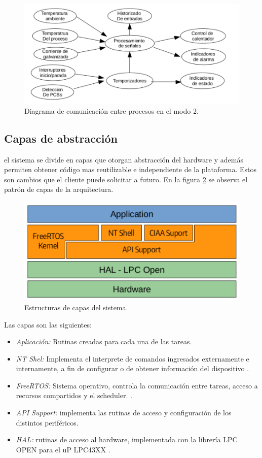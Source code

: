 \begin{figure}[h!]
	\centering
	\includegraphics[width=1.0\textwidth]{Figures/Cap_3/diagrama_comunicacion_2}
	\caption{ Diagrama de comunicación entre procesos en el modo 2. }
	\label{fig:diag_comunicacion_m2}
\end{figure}
 
\subsection{ Capas de abstracción }

el sistema se divide en capas que otorgan abstracción del hardware y además permiten obtener código mas reutilizable e independiente de la plataforma. Estos son cambios que el cliente puede solicitar a futuro.
En la figura \ref{fig:diagrama_capas} se observa el patrón de capas de la arquitectura.

\begin{figure}[h!]
	\centering
	\includegraphics[width=.8\textwidth]{Figures/Cap_3/diagrama_capas}
	\caption{Estructuras de capas del sistema.}
	\label{fig:diagrama_capas}
\end{figure}
 
Las capas son las siguientes: 
\begin{itemize}
\item \emph{Aplicación:} Rutinas creadas para cada una de las tareas.
\item \emph{NT Shel:} Implementa el interprete de comandos ingresados externamente e internamente, a fin de configurar o de obtener información del dispositivo \citep{nt_shell}.
\item \emph{FreeRTOS:} Sistema operativo, controla la comunicación entre tareas, acceso a recursos compartidos y el scheduler. \cite{free_rtos}.
\item \emph{API Support:} implementa las rutinas de acceso y configuración de los distintos periféricos.
\item \emph{HAL:} rutinas de acceso al hardware, implementada con la librería LPC OPEN para el uP LPC43XX \citep{lpcopen}.
\end{itemize}



